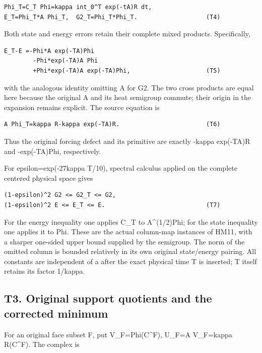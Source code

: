 \documentclass[11pt,a4paper]{article}
\renewcommand{\[}{\begingroup\small\originaldisplaystart}
\renewcommand{\]}{\originaldisplayend\endgroup}
\begin{document}
\begin{verbatim}
Phi_T=C_T Phi=kappa int_0^T exp(-tA)R dt,
E_T=Phi_T*A Phi_T,  G2_T=Phi_T*Phi_T.                   (T4)
\end{verbatim}

Both state and energy errors retain their complete mixed products.
Specifically,

\begin{verbatim}
E_T-E =-Phi*A exp(-TA)Phi
        -Phi*exp(-TA)A Phi
        +Phi*exp(-TA)A exp(-TA)Phi,                     (T5)
\end{verbatim}

with the analogous identity omitting A for G2. The two cross products
are equal here because the original A and its heat semigroup commute;
their origin in the expansion remains explicit. The source equation is

\begin{verbatim}
A Phi_T=kappa R-kappa exp(-TA)R.                        (T6)
\end{verbatim}

Thus the original forcing defect and its primitive are exactly -kappa
exp(-TA)R and -exp(-TA)Phi, respectively.

For epsilon=exp(-27kappa T/10), spectral calculus applied on the
complete centered physical space gives

\begin{verbatim}
(1-epsilon)^2 G2 <= G2_T <= G2,
(1-epsilon)^2 E <= E_T <= E.                            (T7)
\end{verbatim}

For the energy inequality one applies C\_T to A\^{}(1/2)Phi; for the
state inequality one applies it to Phi. These are the actual column-map
instances of HM11, with a sharper one-sided upper bound supplied by the
semigroup. The norm of the omitted column is bounded relatively in its
own original state/energy pairing. All constants are independent of a
after the exact physical time T is inserted; T itself retains its factor
1/kappa.

\subsection{T3. Original support quotients and the corrected
minimum}\label{t3.-original-support-quotients-and-the-corrected-minimum}

For an original face subset F, put V\_F=Phi(C\^{}F), U\_F=A V\_F=kappa
R(C\^{}F). The complex is
\end{document}
